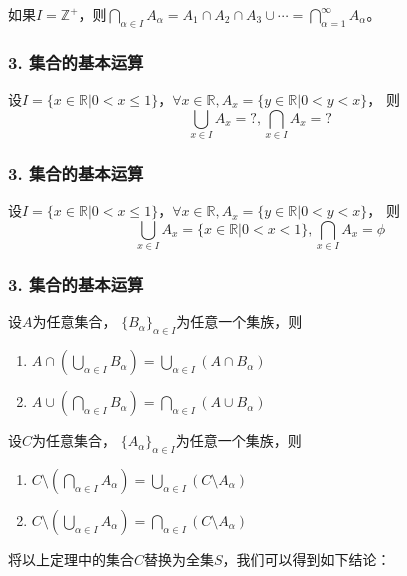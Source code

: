 \documentclass{beamer}
\begin{document}
\begin{CJK*}{UTF8}{gbsn}
\begin{frame}
\begin{Ex}
    如果$I=\mathbb{Z}^+$，则$\bigcap_{\alpha \in I}A_{\alpha} =A_1\cap A_2\cap A_3\cup\cdots=\bigcap_{\alpha=1}^{\infty}A_{\alpha}$。
  \end{Ex}
\end{frame}
\begin{frame}
  \frametitle{3. 集合的基本运算}
  \begin{Ex}
    设$I=\{x \in \mathbb{R} | 0 < x \leq 1\}$，$\forall x \in \mathbb{R}, A_x=\{y\in \mathbb{R}|0 < y < x\}$，
    则
    \begin{equation*}
      \bigcup_{x\in I}A_x=?,
      \bigcap_{x\in I}A_x=?      
    \end{equation*}
  \end{Ex}
\end{frame}
\begin{frame}
  \frametitle{3. 集合的基本运算}
  \begin{Ex}
    设$I=\{x \in \mathbb{R} | 0 < x \leq 1\}$，$\forall x \in \mathbb{R}, A_x=\{y\in \mathbb{R}|0 < y < x\}$，
    则
    \begin{equation*}
      \bigcup_{x\in I}A_x=\{x \in \mathbb{R} | 0 < x < 1\},
      \bigcap_{x\in I}A_x=\phi     
    \end{equation*}
  \end{Ex}
\end{frame}
\begin{frame}
  \frametitle{3. 集合的基本运算}
\begin{Thm}
设$A$为任意集合， $\{B_{\alpha}\}_{\alpha \in I}$为任意一个集族，则
\begin{enumerate}
\item $A \cap (\bigcup_{\alpha \in I}B_{\alpha}) = \bigcup_{\alpha \in I}(A \cap B_{\alpha})$
\item $A \cup (\bigcap_{\alpha \in I}B_{\alpha}) = \bigcap_{\alpha \in I}(A \cup B_{\alpha})$
\end{enumerate}
\end{Thm}
\begin{Thm}
  设$C$为任意集合， $\{A_{\alpha}\}_{\alpha \in I}$为任意一个集族，则
  \begin{enumerate}
  \item $C\setminus(\bigcap_{\alpha \in I}A_{\alpha})=\bigcup_{\alpha\in I}(C\setminus A_{\alpha})$
  \item $C\setminus(\bigcup_{\alpha \in I}A_{\alpha})=\bigcap_{\alpha\in I}(C\setminus A_{\alpha})$
  \end{enumerate}
  \end{Thm}
  将以上定理中的集合$C$替换为全集$S$，我们可以得到如下结论：

\end{frame}
\end{CJK*}
\end{document}
